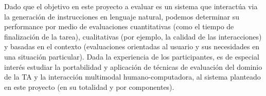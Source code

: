 Dado que el objetivo en este proyecto a evaluar es un sistema que interact\'ua
via la generaci\'on de instrucciones en lenguaje natural, podemos
determinar su performance por medio de evaluaciones cuantitativas (como el
tiempo de finalizaci\'on de la tarea), cualitativas (por ejemplo, la calidad de
las interacciones) y basadas en el contexto (evaluaciones orientadas al usuario
y sus necesidades en una situaci\'on particular). Dada la experiencia de los
participantes, es de especial inter\'es estudiar la  portabilidad y aplicaci\'on
de t\'ecnicas de evaluaci\'on del dominio de la TA y la interacci\'on multimodal
humano-computadora, al sistema  planteado en
este proyecto (en su totalidad y por componentes).

